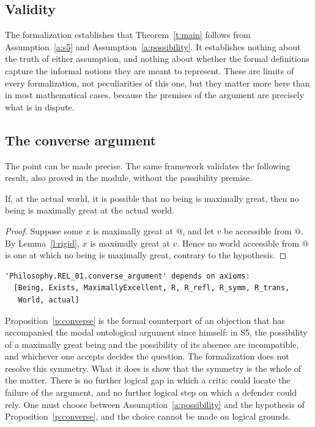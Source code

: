 \documentclass{situationist-preprint}
\begin{document}
\subsection{Validity}

The formalization establishes that Theorem~\ref{t:main} follows from Assumption~\ref{a:s5} and Assumption~\ref{a:possibility}. It establishes nothing about the truth of either assumption, and nothing about whether the formal definitions capture the informal notions they are meant to represent. These are limits of every formalization, not peculiarities of this one, but they matter more here than in most mathematical cases, because the premises of the argument are precisely what is in dispute.

\subsection{The converse argument}

The point can be made precise. The same framework validates the following result, also proved in the module, without the possibility premise.

\begin{proposition}\label{p:converse}
If, at the actual world, it is possible that no being is maximally great, then no being is maximally great at the actual world.
\end{proposition}

\begin{proof}
Suppose some $x$ is maximally great at $@$, and let $v$ be accessible from $@$. By Lemma~\ref{l:rigid}, $x$ is maximally great at $v$. Hence no world accessible from $@$ is one at which no being is maximally great, contrary to the hypothesis.
\end{proof}

\begin{lstlisting}
'Philosophy.REL_01.converse_argument' depends on axioms:
  [Being, Exists, MaximallyExcellent, R, R_refl, R_symm, R_trans,
   World, actual]
\end{lstlisting}

Proposition~\ref{p:converse} is the formal counterpart of an objection that has accompanied the modal ontological argument since \citet{Plantinga1974} himself: in S5, the possibility of a maximally great being and the possibility of its absence are incompatible, and whichever one accepts decides the question. The formalization does not resolve this symmetry. What it does is show that the symmetry is the whole of the matter. There is no further logical gap in which a critic could locate the failure of the argument, and no further logical step on which a defender could rely. One must choose between Assumption~\ref{a:possibility} and the hypothesis of Proposition~\ref{p:converse}, and the choice cannot be made on logical grounds.
\end{document}
